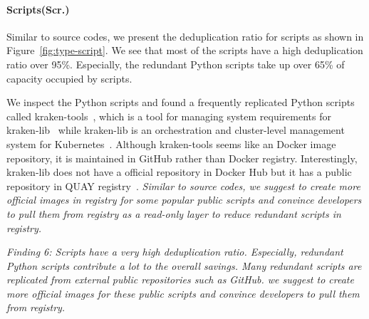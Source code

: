 \paragraph{Scripts(Scr.)}


Similar to source codes, we present the deduplication ratio for scripts as shown in
Figure~\ref{fig:type-script}.
We see that most of the scripts have a high deduplication ratio over 95\%. Especially, the redundant Python scripts take up over 65\% of capacity occupied by scripts. 

We inspect the Python scripts and found a frequently replicated Python scripts called kraken-tools~\cite{xxx}, which is a tool for managing system requirements for kraken-lib~\cite{xxx} while kraken-lib is an orchestration and cluster-level management system for Kubernetes~\cite{xxx}.
%
Although kraken-tools seems like an Docker image repository, it is maintained in GitHub rather than Docker registry. Interestingly, kraken-lib does not have a official repository in Docker Hub but it has a public repository in QUAY registry~\cite{xxx}.
\textit{Similar to source codes, we suggest to create more official images in registry for some popular public scripts %
and convince developers to pull them from registry as a read-only layer to reduce redundant scripts in registry.}

\textit{Finding 6: Scripts have a very high deduplication ratio. Especially, redundant Python scripts contribute a lot to the overall savings. Many redundant scripts are replicated from external public repositories such as GitHub. 
we suggest to create more official images for these public scripts and convince developers to pull them from registry.}
%

